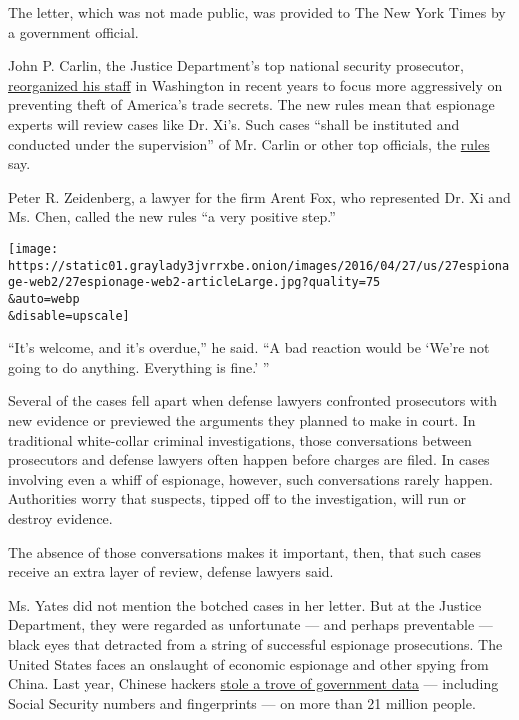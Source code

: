 The letter, which was not made public, was provided to The New York
Times by a government official.

John P. Carlin, the Justice Department's top national security
prosecutor,
\href{http://www.mainjustice.com/2014/10/21/dojs-national-security-division-reorganizes-for-cyber-and-corporate-espionage-threats/}{reorganized
his staff} in Washington in recent years to focus more aggressively on
preventing theft of America's trade secrets. The new rules mean that
espionage experts will review cases like Dr. Xi's. Such cases ``shall be
instituted and conducted under the supervision'' of Mr. Carlin or other
top officials, the
\href{https://www.justice.gov/usam/usam-9-90000-national-security}{rules}
say.

Peter R. Zeidenberg, a lawyer for the firm Arent Fox, who represented
Dr. Xi and Ms. Chen, called the new rules ``a very positive step.''

\texttt{[image: https://static01.graylady3jvrrxbe.onion/images/2016/04/27/us/27espionage-web2/27espionage-web2-articleLarge.jpg?quality=75\\\&auto=webp\\\&disable=upscale]}

``It's welcome, and it's overdue,'' he said. ``A bad reaction would be
`We're not going to do anything. Everything is fine.' ''

Several of the cases fell apart when defense lawyers confronted
prosecutors with new evidence or previewed the arguments they planned to
make in court. In traditional white-collar criminal investigations,
those conversations between prosecutors and defense lawyers often happen
before charges are filed. In cases involving even a whiff of espionage,
however, such conversations rarely happen. Authorities worry that
suspects, tipped off to the investigation, will run or destroy evidence.

The absence of those conversations makes it important, then, that such
cases receive an extra layer of review, defense lawyers said.

Ms. Yates did not mention the botched cases in her letter. But at the
Justice Department, they were regarded as unfortunate --- and perhaps
preventable --- black eyes that detracted from a string of successful
espionage prosecutions. The United States faces an onslaught of economic
espionage and other spying from China. Last year, Chinese hackers
\href{http://www.nytimes3xbfgragh.onion/2015/07/10/us/office-of-personnel-management-hackers-got-data-of-millions.html}{stole
a trove of government data} --- including Social Security numbers and
fingerprints --- on more than 21 million people.

